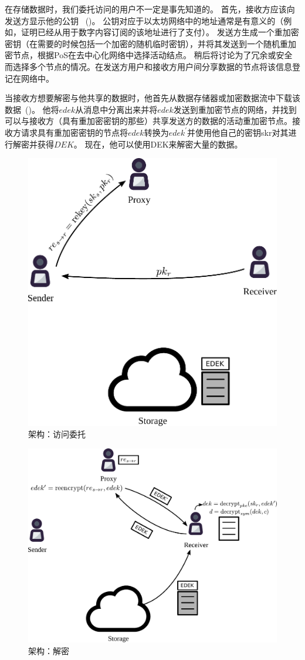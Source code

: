 \documentclass[longbibliography,nofootinbib]{revtex4-1}
\begin{document}
在存储数据时，我们委托访问的用户不一定是事先知道的。 首先，接收方应该向发送方显示他的公钥 ~()。 公钥对应于以太坊网络中的地址通常是有意义的（例如，证明已经从用于数字内容订阅的该地址进行了支付）。 发送方生成一个重加密密钥（在需要的时候包括一个加密的随机临时密钥），并将其发送到一个随机重加密节点，根据PoS在去中心化网络中选择活动结点。 稍后将讨论为了冗余或安全而选择多个节点的情况。在发送方用户和接收方用户间分享数据的节点将该信息登记在网络中。

当接收方想要解密与他共享的数据时，他首先从数据存储器或加密数据流中下载该数据~()。 他将$edek$从消息中分离出来并将$edek$发送到重加密节点的网络，并找到可以与接收方（具有重加密密钥的那些）共享发送方的数据的活动重加密节点。接收方请求具有重加密密钥的节点将$edek$转换为$edek^{\prime}$并使用他自己的密钥skr对其进行解密并获得$DEK$。 现在，他可以使用DEK来解密大量的数据。

\begin{figure}
\centering
    \includegraphics[width=0.4\columnwidth]{pdf/delegate.pdf}
    \caption{架构：访问委托}
    \label{fig:arch-delegate}
\end{figure}

\begin{figure}
\centering
    \includegraphics[width=0.6\columnwidth]{pdf/decrypt.pdf}
    \caption{架构：解密}
    \label{fig:arch-decrypt}
\end{figure}
\end{document}
